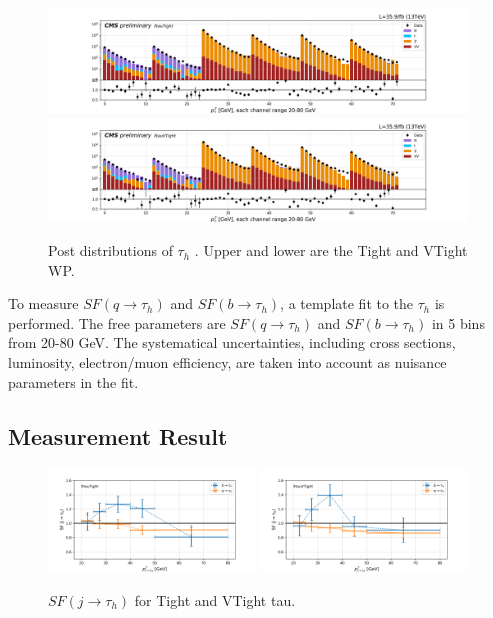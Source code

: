 \begin{figure}
    \centering
    \includegraphics[width=0.99\textwidth]{chapters/Appendix/sectionJetToTauh/figures/2020_tauID_postfit_lltauTight.png}
    \includegraphics[width=0.99\textwidth]{chapters/Appendix/sectionJetToTauh/figures/2020_tauID_postfit_lltauVTight.png}
    \caption{Post distributions of $\tau_h$ \pt. Upper and lower are the Tight and VTight WP. }
    \label{fig:appendix:fakeTauId:postfit}
\end{figure}




To measure $SF (q\to \tau_h)$  and $SF (b\to \tau_h)$, a template fit to the $\tau_h$ \pt is performed.  
The free parameters are $SF (q\to \tau_h)$  and $SF (b\to \tau_h)$ in 5 \pt bins from 20-80 GeV. 
The systematical uncertainties, including cross sections, luminosity, electron/muon
efficiency, are taken into account as nuisance parameters in the fit.



\subsection{Measurement Result}



\begin{figure}
    \centering
    \includegraphics[width=0.49\textwidth]{chapters/Appendix/sectionJetToTauh/figures/fit2_ptflavor2_lltauTight.png}
    \includegraphics[width=0.49\textwidth]{chapters/Appendix/sectionJetToTauh/figures/fit2_ptflavor2_lltauVTight.png}
    \caption{$SF (j\to \tau_h)$ for Tight and VTight tau.}
    \label{fig:appendix:fakeTauId:fit}
\end{figure}



